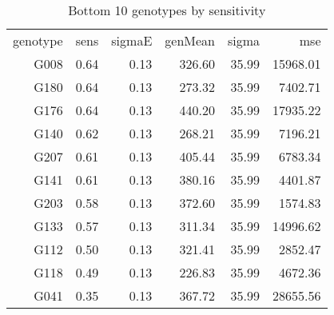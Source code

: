 \documentclass[a4paper,11pt]{article}\usepackage[]{graphicx}\usepackage[]{color}
\begin{document}
\begin{table}[ht]
\begin{flushleft}
\caption{Bottom 10 genotypes by sensitivity} 
\label{bottomEstimates}
\begin{tabular}{rrrrrr}
 genotype & sens & sigmaE & genMean & sigma & mse \\ 
 G008 & 0.64 & 0.13 & 326.60 & 35.99 & 15968.01 \\ 
  G180 & 0.64 & 0.13 & 273.32 & 35.99 & 7402.71 \\ 
  G176 & 0.64 & 0.13 & 440.20 & 35.99 & 17935.22 \\ 
  G140 & 0.62 & 0.13 & 268.21 & 35.99 & 7196.21 \\ 
  G207 & 0.61 & 0.13 & 405.44 & 35.99 & 6783.34 \\ 
  G141 & 0.61 & 0.13 & 380.16 & 35.99 & 4401.87 \\ 
  G203 & 0.58 & 0.13 & 372.60 & 35.99 & 1574.83 \\ 
  G133 & 0.57 & 0.13 & 311.34 & 35.99 & 14996.62 \\ 
  G112 & 0.50 & 0.13 & 321.41 & 35.99 & 2852.47 \\ 
  G118 & 0.49 & 0.13 & 226.83 & 35.99 & 4672.36 \\ 
  G041 & 0.35 & 0.13 & 367.72 & 35.99 & 28655.56 \\ 
  \end{tabular}
\end{flushleft}
\end{table}



\end{document}

